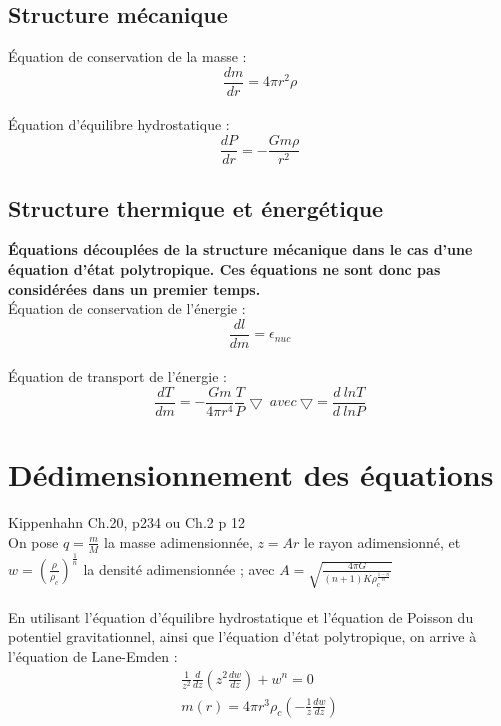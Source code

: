 \documentclass[a4paper,10pt]{article}
\begin{document}
\subsection{Structure mécanique}
Équation de conservation de la masse :
\begin{equation}
\frac{d m}{d r} = 4 \pi r^2 \rho
\end{equation}
\\
Équation d'équilibre hydrostatique :
\begin{equation}
\frac{d P}{d r} = - \frac{G m \rho}{r^2}
\end{equation}
\subsection{Structure thermique et énergétique}
\textbf{Équations découplées de la structure mécanique dans le cas d'une équation d'état polytropique. Ces équations ne sont donc pas considérées dans un premier temps.}\\
Équation de conservation de l'énergie :
\begin{equation}
\frac{d l}{d m}= \epsilon_{nuc}
\end{equation}
\\
Équation de transport de l'énergie :
\begin{equation}
\frac{d T}{d m}= - \frac{G m}{4 \pi r^4} \frac{T}{P} \bigtriangledown ~ avec ~ \bigtriangledown = \frac{d~ln T}{d~ln P}
\end{equation}

\newpage

\section{Dédimensionnement des équations}
Kippenhahn Ch.20, p234 ou Ch.2 p 12\\
On pose $q=\frac{m}{M}$ la masse adimensionnée, $z=A r$ le rayon adimensionné, et $w=(\frac{\rho}{\rho_c})^{\frac{1}{n}}$ la densité adimensionnée ; avec $A=\sqrt{\frac{4 \pi G}{(n+1) K \rho_c^{\frac{1-n}{n}}}}$ \\
\\
En utilisant l'équation d'équilibre hydrostatique et l'équation de Poisson du potentiel gravitationnel, ainsi que l'équation d'état polytropique, on arrive à l'équation de Lane-Emden :\\
\begin{eqnarray}
\frac{1}{z^2}\frac{d}{dz}(z^2 \frac{d w}{dz}) + w^n=0\\
m(r)=4 \pi r^3 \rho_c \left(- \frac{1}{z} \frac{dw}{dz}\right)
\end{eqnarray}
\end{document}
